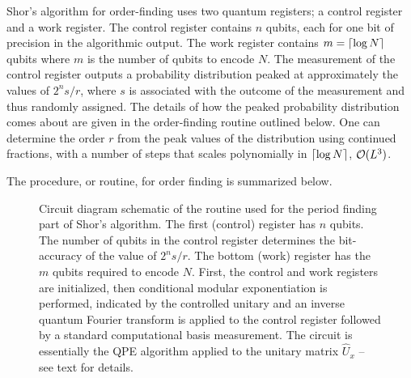 \bigskip
\noindent
Shor's algorithm for order-finding uses two quantum registers; a control register and a work register. The control register contains $n$ qubits, each for one bit of precision in the algorithmic output. The work register contains $m = \lceil\log{N}\rceil$ qubits where $m$ is the number of qubits to encode $N$. The measurement of the control register outputs a probability distribution peaked at approximately the values of $2^n s/r$, where $s$ is associated with the outcome of the measurement and thus randomly assigned. The details of how the peaked probability distribution comes about are given in the order-finding routine outlined below. One can determine the order $r$ from the peak values of the distribution using continued fractions, with a number of steps that scales polynomially in $\lceil\log{N}\rceil$, $\mathcal{O}(L^3)$. 


\clearpage
\noindent
The procedure, or routine, for order finding is summarized below.

\begin{figure}[t]
	\centering
    \caption[Circuit diagram schematic of the routine used for the period finding part of Shor's algorithm.]{Circuit diagram schematic of the routine used for the period finding part of Shor's algorithm. The first (control) register has $n$ qubits. The number of qubits in the control register determines the bit-accuracy of the value of $2^ns/r$. The bottom (work) register has the $m$ qubits required to encode $N$. First, the control and work registers are initialized, then conditional modular exponentiation is performed, indicated by the controlled unitary and an inverse quantum Fourier transform is applied to the control register followed by a standard computational basis measurement. The circuit is essentially the \acs{QPE} algorithm applied to the unitary matrix $\hat{U}_x$ -- see text for details.}
\end{figure}

